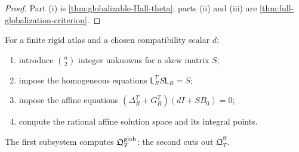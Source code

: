 \begin{proof}
Part (i) is \cref{thm:globalizable-Hall-theta}; parts (ii) and (iii) are
\cref{thm:full-globalization-criterion}.
\end{proof}

\begin{algorithm}
\label{alg:full-principal-test}
For a finite rigid atlas and a chosen compatibility scalar $d$:
\begin{enumerate}[label=\arabic*.,leftmargin=2.2em]
\item introduce $\binom n2$ integer unknowns for a skew matrix $S$;
\item impose the homogeneous equations
      $\mathsf L_R^TS\mathsf L_R=S$;
\item impose the affine equations
      $(\Delta_R^T+G_R^T)(dI+SB_0)=0$;
\item compute the rational affine solution space and its integral points.
\end{enumerate}
The first subsystem computes $\mathfrak Q^{\mathrm{glob}}_T$; the second cuts out
$\mathfrak Q_T^{\mathrm{ff}}$.
\end{algorithm}
